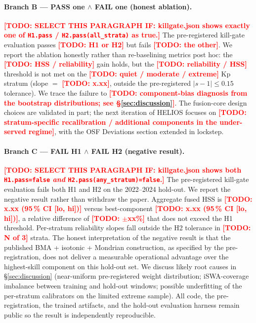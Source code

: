 \documentclass[11pt,letterpaper]{article}
\newcommand{\todo}[1]{\textcolor{red}{\textbf{[TODO: #1]}}}
\begin{document}
\paragraph{Branch B --- PASS one \texorpdfstring{$\land$}{AND} FAIL one (honest ablation).}
\todo{SELECT THIS PARAGRAPH IF: killgate.json shows exactly one of
\texttt{H1.pass} / \texttt{H2.pass(all\_strata)} as true.}
The pre-registered kill-gate evaluation passes \todo{H1 or H2} but
fails \todo{the other}.  We report the ablation honestly rather than
re-baselining metrics post hoc: the
\todo{HSS / reliability} gain holds, but the
\todo{reliability / HSS} threshold is not met on the
\todo{quiet / moderate / extreme} Kp stratum
(slope $= $ \todo{x.xx}, outside the pre-registered $|s-1|\le 0.15$
tolerance).  We trace the failure to
\todo{component-bias diagnosis from the bootstrap distributions; see
§\ref{sec:discussion}}.  The fusion-core design choices are validated
in part; the next iteration of HELIOS focuses on
\todo{stratum-specific recalibration / additional components in the
under-served regime}, with the OSF Deviations section
\cite{osf_prereg} extended in lockstep.

\paragraph{Branch C --- FAIL H1 \texorpdfstring{$\land$}{AND} FAIL H2 (negative result).}
\todo{SELECT THIS PARAGRAPH IF: killgate.json shows both
\texttt{H1.pass=false} \emph{and} \texttt{H2.pass(any\_stratum)=false}.}
The pre-registered kill-gate evaluation fails both H1 and H2 on the
2022--2024 hold-out.  We report the negative result rather than
withdraw the paper.  Aggregate fused HSS is
\todo{x.xx (95\,\% CI [lo, hi])} versus best-component
\todo{x.xx (95\,\% CI [lo, hi])}, a relative difference of
\todo{$\pm$xx\%} that does not exceed the H1 threshold.  Per-stratum
reliability slopes fall outside the H2 tolerance in
\todo{N of 3} strata.  The honest interpretation of the negative result
is that the published BMA + isotonic + Mondrian construction, as
specified by the pre-registration, does not deliver a measurable
operational advantage over the highest-skill component on this
hold-out set.  We discuss likely root causes in §\ref{sec:discussion}
(near-uniform pre-registered weight distribution; iSWA-coverage
imbalance between training and hold-out windows; possible
underfitting of the per-stratum calibrators on the limited extreme
sample).  All code, the pre-registration, the trained artifacts, and the
hold-out evaluation harness remain public \cite{helios_fusion_engine} so
the result is independently reproducible.
\end{document}
